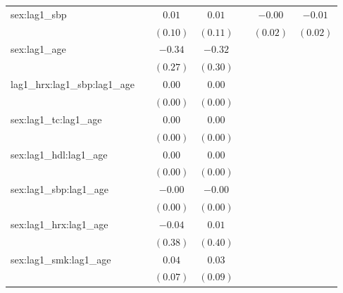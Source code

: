 \begin{tabular}{l c c c c c c}
sex:lag1\_sbp                     &              & $0.01$     & $0.01$     &                & $-0.00$        & $-0.01$        \\
                                  &              & $(0.10)$   & $(0.11)$   &                & $(0.02)$       & $(0.02)$       \\
sex:lag1\_age                     &              & $-0.34$    & $-0.32$    &                &                &                \\
                                  &              & $(0.27)$   & $(0.30)$   &                &                &                \\
lag1\_hrx:lag1\_sbp:lag1\_age     &              & $0.00$     & $0.00$     &                &                &                \\
                                  &              & $(0.00)$   & $(0.00)$   &                &                &                \\
sex:lag1\_tc:lag1\_age            &              & $0.00$     & $0.00$     &                &                &                \\
                                  &              & $(0.00)$   & $(0.00)$   &                &                &                \\
sex:lag1\_hdl:lag1\_age           &              & $0.00$     & $0.00$     &                &                &                \\
                                  &              & $(0.00)$   & $(0.00)$   &                &                &                \\
sex:lag1\_sbp:lag1\_age           &              & $-0.00$    & $-0.00$    &                &                &                \\
                                  &              & $(0.00)$   & $(0.00)$   &                &                &                \\
sex:lag1\_hrx:lag1\_age           &              & $-0.04$    & $0.01$     &                &                &                \\
                                  &              & $(0.38)$   & $(0.40)$   &                &                &                \\
sex:lag1\_smk:lag1\_age           &              & $0.04$     & $0.03$     &                &                &                \\
                                  &              & $(0.07)$   & $(0.09)$   &                &                &                \\

\end{tabular}
